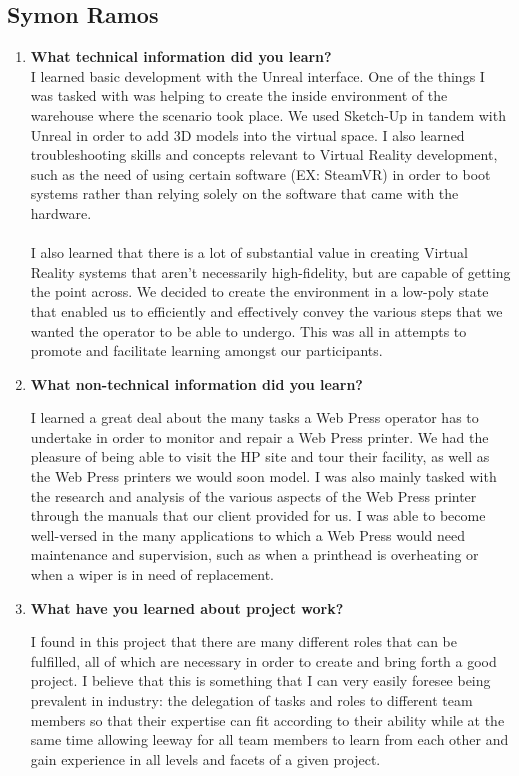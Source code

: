 \documentclass[onecolumn, draftclsnofoot,10pt, compsoc]{IEEEtran}
\begin{document}
\subsection{Symon Ramos}
\begin{enumerate}
    \item \textbf{What technical information did you learn?}
    \\
    I learned basic development with the Unreal interface. One of the things I was tasked with was helping to create the inside environment of the warehouse where the scenario took place. We used Sketch-Up in tandem with Unreal in order to add 3D models into the virtual space. I also learned troubleshooting skills and concepts relevant to Virtual Reality development, such as the need of using certain software (EX: SteamVR) in order to boot systems rather than relying solely on the software that came with the hardware. 
    \\\\
    I also learned that there is a lot of substantial value in creating Virtual Reality systems that aren't necessarily high-fidelity, but are capable of getting the point across. We decided to create the environment in a low-poly state that enabled us to efficiently and effectively convey the various steps that we wanted the operator to be able to undergo. This was all in attempts to promote and facilitate learning amongst our participants. 
        
    \item \textbf{What non-technical information did you learn?}
    
    I learned a great deal about the many tasks a Web Press operator has to undertake in order to monitor and repair a Web Press printer. We had the pleasure of being able to visit the HP site and tour their facility, as well as the Web Press printers we would soon model. I was also mainly tasked with the research and analysis of the various aspects of the Web Press printer through the manuals that our client provided for us. I was able to become well-versed in the many applications to which a Web Press would need maintenance and supervision, such as when a printhead is overheating or when a wiper is in need of replacement. 
    
    \item \textbf{What have you learned about project work?}
    
    I found in this project that there are many different roles that can be fulfilled, all of which are necessary in order to create and bring forth a good project. I believe that this is something that I can very easily foresee being prevalent in industry: the delegation of tasks and roles to different team members so that their expertise can fit according to their ability while at the same time allowing leeway for all team members to learn from each other and gain experience in all levels and facets of a given project.
    

\end{enumerate}
\end{document}

